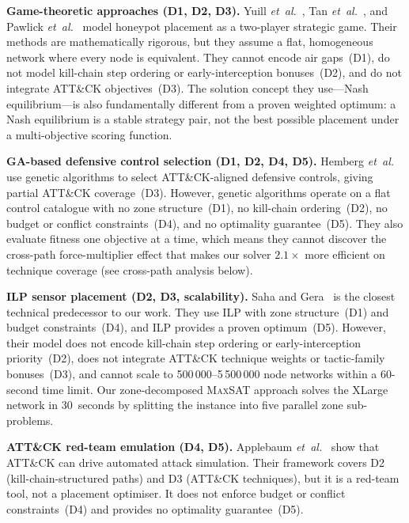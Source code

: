 \documentclass[journal]{IEEEtran}
\newcommand{\xmark}{\textcolor{novelred}{\ding{55}}}
\newcommand{\etal}{\emph{et~al.}}
\newcommand{\maxsat}{\textsc{MaxSAT}}
\begin{document}
\textbf{Game-theoretic approaches (\xmark{}D1,
\xmark{}D2, \xmark{}D3).}
Yuill \etal{}~\cite{yuill2004}, Tan \etal{}~\cite{tan2011},
and Pawlick \etal{}~\cite{pawlick2019} model honeypot
placement as a two-player strategic game.
Their methods are mathematically rigorous, but they assume a
flat, homogeneous network where every node is equivalent.
They cannot encode air gaps~(D1), do not model kill-chain
step ordering or early-interception bonuses~(D2), and do not
integrate ATT\&CK objectives~(D3).
The solution concept they use---Nash equilibrium---is also
fundamentally different from a proven weighted optimum: a
Nash equilibrium is a stable strategy pair, not the best
possible placement under a multi-objective scoring function.

\textbf{GA-based defensive control selection
(\xmark{}D1, \xmark{}D2, \xmark{}D4, \xmark{}D5).}
Hemberg \etal{}~\cite{hemberg2020} use genetic algorithms
to select ATT\&CK-aligned defensive controls, giving partial
ATT\&CK coverage~(D3).
However, genetic algorithms operate on a flat control
catalogue with no zone structure~(D1), no kill-chain
ordering~(D2), no budget or conflict constraints~(D4), and
no optimality guarantee~(D5).
They also evaluate fitness one objective at a time, which
means they cannot discover the cross-path force-multiplier
effect that makes our solver $2.1\times$ more efficient on
technique coverage (see cross-path analysis below).

\textbf{ILP sensor placement (\xmark{}D2, \xmark{}D3,
scalability).}
Saha and Gera~\cite{saha2015} is the closest technical
predecessor to our work.
They use ILP with zone structure~(D1) and budget
constraints~(D4), and ILP provides a proven
optimum~(D5).
However, their model does not encode kill-chain step ordering
or early-interception priority~(D2), does not integrate
ATT\&CK technique weights or tactic-family bonuses~(D3),
and cannot scale to 500\,000--5\,500\,000 node networks
within a 60-second time limit.
Our zone-decomposed \maxsat{} approach solves the XLarge
network in 30~seconds by splitting the instance into five
parallel zone sub-problems.

\textbf{ATT\&CK red-team emulation (\xmark{}D4,
\xmark{}D5).}
Applebaum \etal{}~\cite{applebaum2016} show that ATT\&CK
can drive automated attack simulation.
Their framework covers D2 (kill-chain-structured paths) and
D3 (ATT\&CK techniques), but it is a red-team tool, not a
placement optimiser.
It does not enforce budget or conflict constraints~(D4) and
provides no optimality guarantee~(D5).
\end{document}
